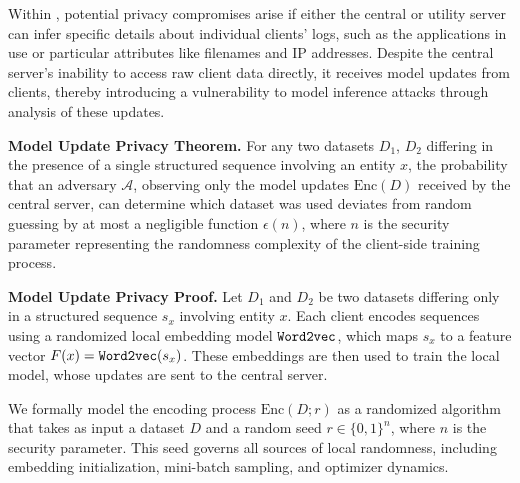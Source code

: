  Within \Sys, potential privacy compromises arise if either the central or utility server can infer specific details about individual clients' logs, such as the applications in use or particular attributes like filenames and IP addresses. Despite the central server's inability to access raw client data directly, it receives model updates from clients, thereby introducing a vulnerability to model inference attacks through analysis of these updates.



\textbf{Model Update Privacy Theorem.}  
For any two datasets \(D_1\), \(D_2\) differing in the presence of a single structured sequence involving an entity \(x\), the probability that an adversary \(\mathcal{A}\), observing only the model updates \(\text{Enc}(D)\) received by the central server, can determine which dataset was used deviates from random guessing by at most a negligible function \(\epsilon(n)\), where \(n\) is the security parameter representing the randomness complexity of the client-side training process.

\textbf{Model Update Privacy Proof.}  
Let \(D_1\) and \(D_2\) be two datasets differing only in a structured sequence \(s_x\) involving entity \(x\). Each client encodes sequences using a randomized local embedding model \(\texttt{Word2vec}\), which maps \(s_x\) to a feature vector \(F(x) = \texttt{Word2vec}(s_x)\). These embeddings are then used to train the local model, whose updates are sent to the central server.

We formally model the encoding process \(\text{Enc}(D; r)\) as a randomized algorithm that takes as input a dataset \(D\) and a random seed \(r \in \{0,1\}^n\), where \(n\) is the security parameter. This seed governs all sources of local randomness, including embedding initialization, mini-batch sampling, and optimizer dynamics. 

